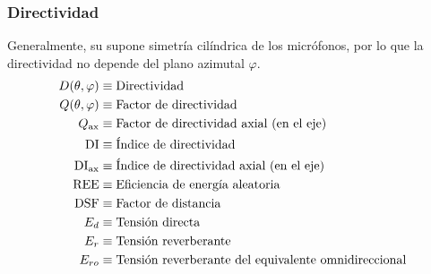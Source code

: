 \documentclass[a4paper, 8pt]{extarticle}
\begin{document}
\begin{multicols}{3}
  \subsubsection{Directividad}
  Generalmente, su supone simetría cilíndrica de los micrófonos, por lo que la directividad no depende del plano azimutal $\varphi$.
  \begin{align*}
    D(\theta, \varphi )          & \equiv \text{Directividad}                                         \\
    Q(\theta, \varphi )          & \equiv \text{Factor de directividad}                               \\
    Q _{\textnormal{ax}}         & \equiv \text{Factor de directividad axial (en el eje)}             \\
    \text{DI}                    & \equiv \text{Índice de directividad}                               \\
    \text{DI} _{\textnormal{ax}} & \equiv \text{Índice de directividad axial (en el eje)}             \\
    \text{REE}                   & \equiv \text{Eficiencia de energía aleatoria}                      \\
    \text{DSF}                   & \equiv \text{Factor de distancia}                                  \\
    E_d                          & \equiv \text{Tensión directa}                                      \\
    E_r                          & \equiv \text{Tensión reverberante}                                 \\
    E_{ro}                       & \equiv \text{Tensión reverberante del equivalente omnidireccional} \\
  \end{align*}


\end{multicols}
\end{document}
